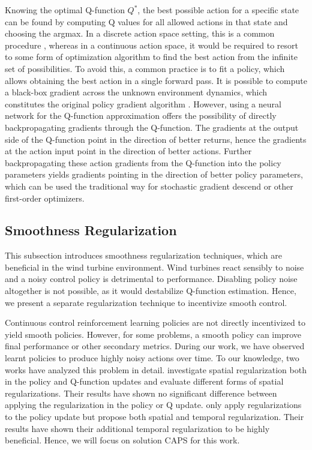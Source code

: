 Knowing the optimal Q-function $Q^*$, the best possible action for a specific state can be found by computing Q values for all allowed actions in that state and choosing the argmax. In a discrete action space setting, this is a common procedure \cite{mnihPlayingAtariDeep2013}, whereas in a continuous action space, it would be required to resort to some form of optimization algorithm to find the best action from the infinite set of possibilities. To avoid this, a common practice is to fit a policy, which allows obtaining the best action in a single forward pass. It is possible to compute a black-box gradient across the unknown environment dynamics, which constitutes the original policy gradient algorithm \cite{suttonPolicyGradientMethods2000}. However, using a neural network for the Q-function approximation offers the possibility of directly backpropagating gradients through the Q-function. The gradients at the output side of the Q-function point in the direction of better returns, hence the gradients at the action input point in the direction of better actions. Further backpropagating these action gradients from the Q-function into the policy parameters yields gradients pointing in the direction of better policy parameters, which can be used the traditional way for stochastic gradient descend or other first-order optimizers.


\subsection{Smoothness Regularization}
\label{section:background-smoothness-regularization}

\begin{summary}
This subsection introduces smoothness regularization techniques, which are beneficial in the wind turbine environment. Wind turbines react sensibly to noise and a noisy control policy is detrimental to performance. Disabling policy noise altogether is not possible, as it would destabilize Q-function estimation. Hence, we present a separate regularization technique to incentivize smooth control.
\end{summary}

Continuous control reinforcement learning policies are not directly incentivized to yield smooth policies. However, for some problems, a smooth policy can improve final performance or other secondary metrics. During our work, we have observed learnt policies to produce highly noisy actions over time. To our knowledge, two works have analyzed this problem in detail. \citet{shenDeepReinforcementLearning2020} investigate spatial regularization both in the policy and Q-function updates and evaluate different forms of spatial regularizations. Their results have shown no significant difference between applying the regularization in the policy or Q update. \citet{mysoreRegularizingActionPolicies2021} only apply regularizations to the policy update but propose both spatial and temporal regularization. Their results have shown their additional temporal regularization to be highly beneficial. Hence, we will focus on  solution \acf{CAPS} for this work.

